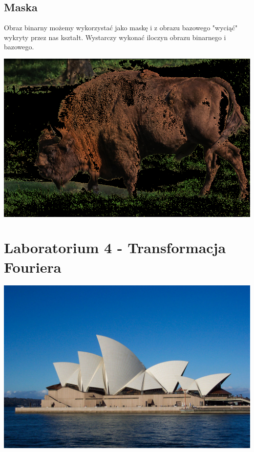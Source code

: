 \documentclass{article}
\begin{document}
	\subsection{Maska}
	Obraz binarny możemy wykorzystać jako maskę i z obrazu bazowego "wyciąć" wykryty przez nas kształt. Wystarczy wykonać iloczyn obrazu binarnego i bazowego.
	\begin{center}
		\includegraphics[width=\linewidth]{../../lab03/bison_mask.png}
	\end{center}
	
	\section{Laboratorium 4 - Transformacja Fouriera}
	\begin{center}
		\includegraphics[width=\linewidth]{../../pictures/opera.jpg}
	\end{center}
\end{document}
